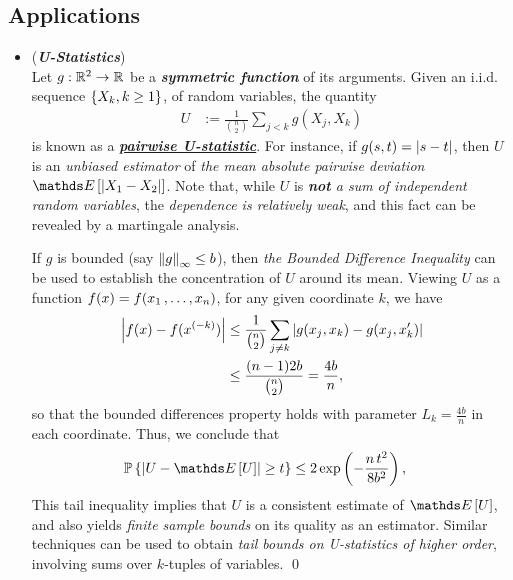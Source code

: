 \documentclass[11pt]{article}
\begin{document}


\subsection{Applications}
\begin{itemize}
\item \begin{example} (\textbf{\emph{U-Statistics}}) \citep{wainwright2019high}\\
Let $g: {\mathbb R}^2 \to {\mathbb R}$ be a \emph{\textbf{symmetric function}} of its arguments. Given an i.i.d. sequence $\left\{X_k, k \ge 1\right\}$, of random variables, the quantity
\begin{align}
U&:= \frac{1}{{n \choose 2}}\sum_{j < k}g(X_j, X_k)\label{def: u_stats}
\end{align} is known as a \underline{\emph{\textbf{pairwise U-statistic}}}. For instance, if $g(s, t) = \left\lvert s - t \right\rvert$, then $U$ is an \emph{unbiased estimator} of \emph{the mean absolute pairwise deviation $\E{}{\abs{X_1 - X_2}}$}. 
Note that, while $U$ is \emph{\textbf{not} a sum of independent random variables}, the \emph{dependence is relatively weak}, and this fact can be revealed by a martingale analysis. 

If $g$ is bounded (say $\left\|g\right\|_{\infty} \le b$), then \emph{the Bounded Difference Inequality} can be used to establish the concentration of $U$ around its mean. Viewing $U$ as a function $f(x) = f(x_1 \,{,}\ldots{,}\, x_n)$, for any given coordinate $k$, we have
\begin{align*}
\left\lvert f(x) - f(x^{(-k)}) \right\rvert &\le  \frac{1}{{n \choose 2}}\sum_{j \neq k}\left\lvert g(x_j, x_k) - g(x_j, x_k') \right\rvert \\
&\le \frac{(n-1) 2b }{{n \choose 2}} = \frac{4b}{n},
\end{align*} so that the bounded differences property holds with parameter $L_k = \frac{4b}{n}$ in each coordinate. Thus, we conclude that
\begin{align*}
\bP\set{\abs{U - \E{}{U}} \ge t} &\le 2 \exp\paren{-\frac{n\,t^2}{8 b^2}},
\end{align*} This tail inequality implies that $U$ is a consistent estimate of $\E{}{U}$, and also yields \emph{finite sample bounds} on its quality as an estimator. Similar techniques can be used to obtain \emph{tail bounds on U-statistics of higher order}, involving sums over $k$-tuples of variables. \qed
\end{example}


\end{itemize}
\end{document}

